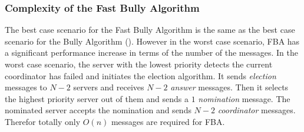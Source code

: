 \documentclass[dareport.tex]{subfiles}
\begin{document}
%			
%			
%			

\subsubsection{Complexity of the Fast Bully Algorithm}
The best case scenario for the Fast Bully Algorithm is the same as the best case scenario for the Bully Algorithm (). However in the worst case scenario, FBA has a significant performance increase in terms of the number of the messages. In the worst case scenario, the server with the lowest priority detects the current coordinator has failed and initiates the election algorithm. It sends \emph{election} messages to $ N-2 $ servers and receives $ N-2 $ \emph{answer} messages. Then it selects the highest priority server out of them and sends a $ 1 $ \emph{nomination} message. The nominated server accepts the nomination and sends $ N-2 $ \emph{coordinator} messages. Therefor totally only $ O(n) $ messages are required for FBA.
\end{document}
